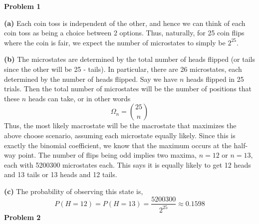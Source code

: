 \documentclass[10pt]{article}
\begin{document}
\textbf{Problem 1}

\textbf{(a)}
Each coin toss is independent of the other, and hence we can think of each coin toss as being a choice between 2 options. Thus, naturally, for 25 coin flips where the coin is fair, we expect the number of microstates to simply be $2^{25}$.

\textbf{(b)}
The microstates are determined by the total number of heads flipped (or tails since the other will be 25 - tails). In particular, there are 26 microstates, each determined by the number of heads flipped. Say we have $n$ heads flipped in 25 trials. Then the total number of microstates will be the number of positions that these $n$ heads can take, or in other words
$$\Omega_{n} = {25\choose n}$$
Thus, the most likely macrostate will be the macrostate that maximizes the above choose scenario, assuming each microstate equally likely. Since this is exactly the binomial coefficient, we know that the maximum occurs at the half-way point. The number of flips being odd implies two maxima, $n=12$ or $n=13$, each with 5200300 microstates each. This says it is equally likely to get 12 heads and 13 tails or 13 heads and 12 tails.

\textbf{(c)}
The probability of observing this state is,
$$P(H = 12)=P(H=13) = \frac{5200300}{2^{25}} \approx 0.1598$$
\textbf{Problem 2}
\end{document}
